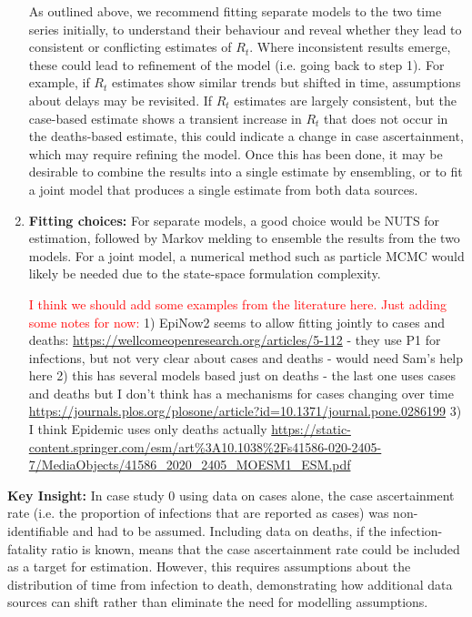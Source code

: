 \documentclass{article}
\begin{document}
\begin{enumerate}
       As outlined above, we recommend fitting separate models to the two time series initially, to understand their behaviour and reveal whether they lead to consistent or conflicting estimates of $R_t$. Where inconsistent results emerge, these could lead to refinement of the model (i.e. going back to step 1). For example, if $R_t$ estimates show similar trends but shifted in time, assumptions about delays may be revisited. If $R_t$ estimates are largely consistent, but the case-based estimate shows a transient increase in $R_t$ that does not occur in the deaths-based estimate, this could indicate a change in case ascertainment, which may require refining the model. Once this has been done, it may be desirable to combine the results into a single estimate by ensembling, or to fit a joint model that produces a single estimate from both data sources.  
       
    \item \textbf{Fitting choices:} For separate models, a good choice would be NUTS for estimation, followed by Markov melding to ensemble the results from the two models. For a joint model, a numerical method such as particle MCMC would likely be needed due to the state-space formulation complexity.

    \textcolor{red}{I think we should add some examples from the literature here. Just adding some notes for now:} 1) EpiNow2 seems to allow fitting jointly to cases and deaths: \url{https://wellcomeopenresearch.org/articles/5-112} - they use P1 for infections, but not very clear about cases and deaths - would need Sam's help here 2) this has several models based just on deaths - the last one uses cases and deaths but I don't think has a mechanisms for cases changing over time \url{https://journals.plos.org/plosone/article?id=10.1371/journal.pone.0286199} 3) I think Epidemic uses only deaths actually \url{https://static-content.springer.com/esm/art%3A10.1038%2Fs41586-020-2405-7/MediaObjects/41586_2020_2405_MOESM1_ESM.pdf}

    \end{enumerate}

\textbf{Key Insight:} In case study 0 using data on cases alone, the case ascertainment rate (i.e. the proportion of infections that are reported as cases) was non-identifiable and had to be assumed. Including data on deaths, if the infection-fatality ratio is known, means that the case ascertainment rate could be included as a target for estimation. However, this requires assumptions about the distribution of time from infection to death, demonstrating how additional data sources can shift rather than eliminate the need for modelling assumptions.
\end{document}
